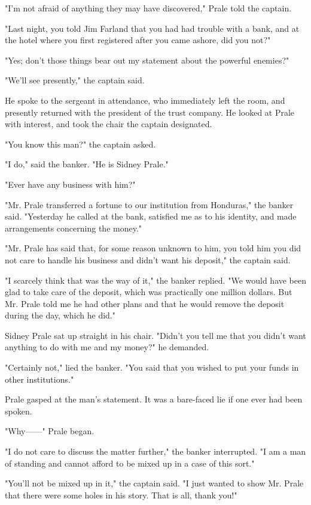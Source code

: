 \documentclass{novel}
\begin{document}
"I'm not afraid of anything they may have discovered," Prale told the captain.

"Last night, you told Jim Farland that you had had trouble with a bank, and at the hotel where you first registered after you came ashore, did you not?"

"Yes; don't those things bear out my statement about the powerful enemies?"

"We'll see presently," the captain said.

He spoke to the sergeant in attendance, who immediately left the room, and presently returned with the president of the trust company. He looked at Prale with interest, and took the chair the captain designated.

"You know this man?" the captain asked.

"I do," said the banker. "He is Sidney Prale."

"Ever have any business with him?"

"Mr. Prale transferred a fortune to our institution from Honduras," the banker said. "Yesterday he called at the bank, satisfied me as to his identity, and made arrangements concerning the money."

"Mr. Prale has said that, for some reason unknown to him, you told him you did not care to handle his business and didn't want his deposit," the captain said.

"I scarcely think that was the way of it," the banker replied. "We would have been glad to take care of the deposit, which was practically one million dollars. But Mr. Prale told me he had other plans and that he would remove the deposit during the day, which he did."

Sidney Prale sat up straight in his chair. "Didn't you tell me that you didn't want anything to do with me and my money?" he demanded.

"Certainly not," lied the banker. "You said that you wished to put your funds in other institutions."

Prale gasped at the man's statement. It was a bare-faced lie if one ever had been spoken.

"Why------" Prale began.

"I do not care to discuss the matter further," the banker interrupted. "I am a man of standing and cannot afford to be mixed up in a case of this sort."

"You'll not be mixed up in it," the captain said. "I just wanted to show Mr. Prale that there were some holes in his story. That is all, thank you!"
\end{document}
